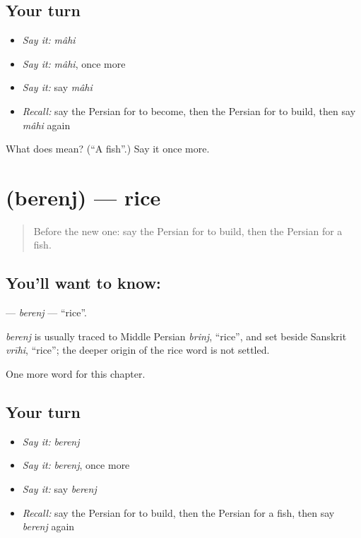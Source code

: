 \subsection*{Your turn}
\begin{itemize}
\raggedright
  \item \emph{Say it:} \emph{mâhi}
  \item \emph{Say it:} \emph{mâhi}, once more
  \item \emph{Say it:} say \emph{mâhi}
  \item \emph{Recall:} say the Persian for to become, then the Persian for to build, then say \emph{mâhi} again
\end{itemize}

\begin{tcolorbox}[breakable,colback=teal!4,colframe=teal!35!black,title={Before you move on}]
What does  mean? (\textquotedblleft{}A fish\textquotedblright{}.) Say it once more.
\end{tcolorbox}
\section[\texorpdfstring{\fa{برنج} (berenj)}{برنج (berenj)}]{ (berenj) — rice}

\label{lesson:FA-C40-berenj}



\begin{quote}
Before the new one: say the Persian for to build, then the Persian for a fish.
\end{quote}

\subsection*{You'll want to know: }
\textbf{} — \emph{berenj} — \textquotedblleft{}rice\textquotedblright{}.

\begin{cousinweb}
\emph{berenj} is usually traced to Middle Persian \emph{brinj}, \textquotedblleft{}rice\textquotedblright{}, and set beside Sanskrit \emph{vrīhi}, \textquotedblleft{}rice\textquotedblright{}; the deeper origin of the rice word is not settled.
\end{cousinweb}

\begin{grammarlens}[title={What you've built}]
One more word for this chapter.
\end{grammarlens}

\subsection*{Your turn}
\begin{itemize}
\raggedright
  \item \emph{Say it:} \emph{berenj}
  \item \emph{Say it:} \emph{berenj}, once more
  \item \emph{Say it:} say \emph{berenj}
  \item \emph{Recall:} say the Persian for to build, then the Persian for a fish, then say \emph{berenj} again
\end{itemize}

